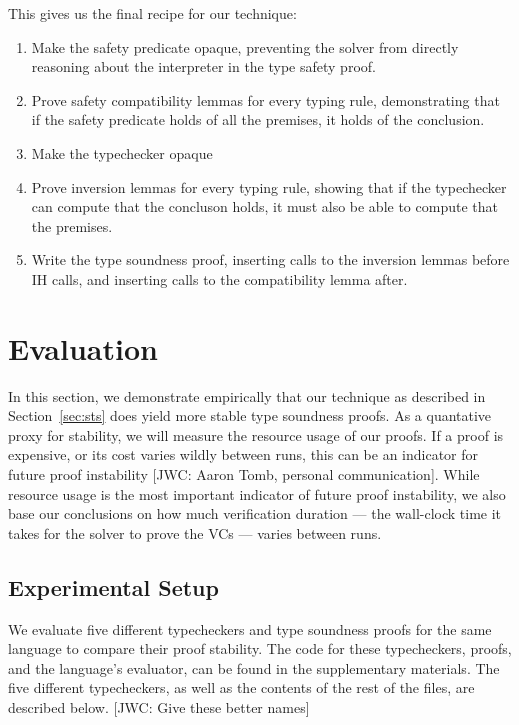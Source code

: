\documentclass[sigplan,review,screen,anonymous]{acmart}
\newcommand{\comm}[3]{\textcolor{#1}{[#2: #3]}}
\newcommand{\jwc}[1]{\comm{dkgreen}{JWC}{#1}}
\begin{document}
This gives us the final recipe for our technique:

\begin{enumerate}
  \item Make the safety predicate opaque, preventing the solver from directly reasoning about the interpreter in the type safety proof.
  \item Prove safety compatibility lemmas for every typing rule, demonstrating that if the safety predicate holds of all the premises, it holds of the conclusion.
  \item Make the typechecker opaque
  \item Prove inversion lemmas for every typing rule, showing that if the typechecker can compute that the concluson holds, it must also be able to compute that the premises.
  \item Write the type soundness proof, inserting calls to the inversion lemmas before IH calls, and inserting calls to the compatibility lemma after.
\end{enumerate}






\section{Evaluation}
\label{sec:eval}
In this section, we demonstrate empirically that our technique as described in Section~\ref{sec:sts}
does yield more stable type soundness proofs. As a quantative proxy for stability, we will measure
the resource usage of our proofs. If a proof is expensive, or its cost varies wildly
between runs, this can be an indicator for future proof instability \jwc{Aaron Tomb, personal communication}.
While resource usage is the most important indicator of future proof instability, we also
base our conclusions on how much verification duration --- the wall-clock time it takes for the solver
to prove the VCs --- varies between runs.

\subsection*{Experimental Setup}
We evaluate five different typecheckers and type soundness proofs for the same
language to compare their proof stability.  The code for these typecheckers, proofs, and the language's evaluator, can be found in
the supplementary materials. The five different typecheckers, as well as the contents of the rest of the files, are described below.
\jwc{Give these better names}
\end{document}
